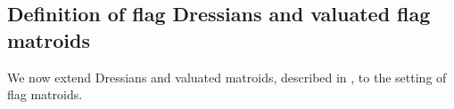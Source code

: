 \documentclass[11pt]{amsart}
\newcommand{\be}{\mathbf e}
\theoremstyle{definition}
\newtheorem{defn}[thm]{Definition}
\newtheorem{eg}[thm]{Example}
\begin{document}



\subsection{Definition of flag Dressians and valuated flag matroids}
\label{subsection:matquot}

We now extend Dressians and valuated matroids, described in , to the setting of flag matroids.  %
\end{document}
